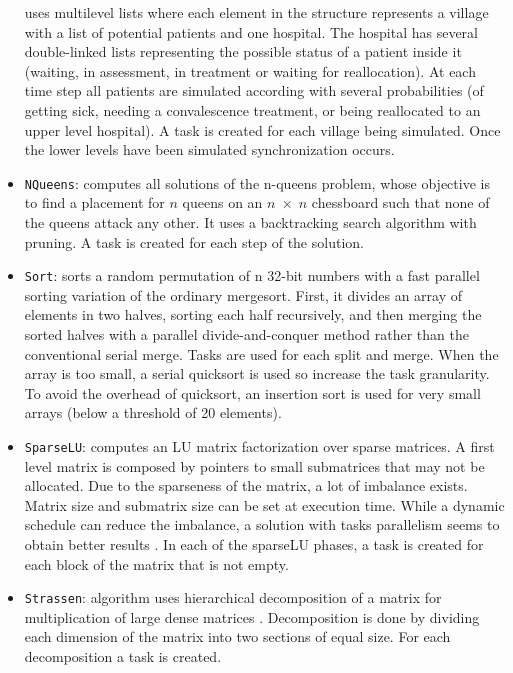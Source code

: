 \documentclass[sigconf]{acmart}
\begin{document}
\begin{itemize}
uses multilevel lists where each element in the structure  represents  a
village with  a  list  of  potential patients and one hospital. The hospital
has several double-linked lists representing the possible status of a patient
inside it (waiting, in assessment,   in   treatment   or   waiting   for
reallocation).  At  each time step  all  patients  are  simulated  according
with several probabilities (of getting sick, needing a convalescence treatment,
or  being  reallocated to  an  upper  level  hospital).  A  task  is  created
for  each  village being  simulated.  Once  the lower   levels   have   been
simulated synchronization   occurs. 
\item \texttt{NQueens}: computes  all  solutions  of  the n-queens
problem, whose objective is to find a placement for $n$ queens on an $n \;
\times \; n$ chessboard such that none of the queens attack any other. It uses
a backtracking search algorithm with pruning. A task is created for each step
of the solution.
\item \texttt{Sort}: sorts a random permutation of n 32-bit numbers with  a
fast  parallel  sorting  variation  \cite{mergesort}  of  the  ordinary
mergesort.  First, it divides an array of elements in two halves, sorting  each
half  recursively,  and  then  merging  the  sorted halves with a parallel
divide-and-conquer method rather than the  conventional  serial  merge.  Tasks
are  used  for  each  split and merge. When the array is too small, a serial
quicksort is used  so increase  the  task  granularity.  To  avoid  the
overhead of  quicksort,  an insertion  sort  is  used  for  very  small  arrays
(below a threshold of 20 elements).
\item \texttt{SparseLU}: computes an LU matrix factorization over
sparse matrices. A first level matrix is composed by pointers to  small
submatrices  that  may  not  be  allocated.  Due  to  the sparseness  of  the
matrix,  a  lot  of  imbalance  exists.  Matrix size and submatrix size can be
set at execution time. While a dynamic schedule can reduce the imbalance, a
solution with tasks parallelism seems to obtain better results \cite{}. In each
of the sparseLU  phases,  a  task  is  created  for  each  block  of  the
matrix that is not empty.
\item \texttt{Strassen}: algorithm  uses  hierarchical  decomposition of a
matrix for multiplication of large dense matrices \cite{}. Decomposition is
done by dividing each dimension of the matrix into  two  sections  of  equal
size. For each decomposition a task is created. 
\end{itemize}
\end{document}

